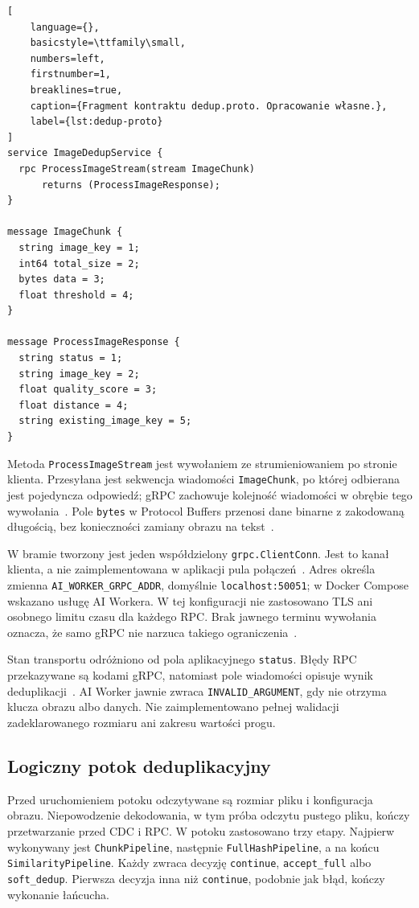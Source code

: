\begin{lstlisting}[
    language={},
    basicstyle=\ttfamily\small,
    numbers=left,
    firstnumber=1,
    breaklines=true,
    caption={Fragment kontraktu dedup.proto. Opracowanie własne.},
    label={lst:dedup-proto}
]
service ImageDedupService {
  rpc ProcessImageStream(stream ImageChunk)
      returns (ProcessImageResponse);
}

message ImageChunk {
  string image_key = 1;
  int64 total_size = 2;
  bytes data = 3;
  float threshold = 4;
}

message ProcessImageResponse {
  string status = 1;
  string image_key = 2;
  float quality_score = 3;
  float distance = 4;
  string existing_image_key = 5;
}
\end{lstlisting}

Metoda \texttt{ProcessImageStream} jest wywołaniem ze strumieniowaniem
po stronie klienta. Przesyłana jest sekwencja wiadomości
\texttt{ImageChunk}, po której odbierana jest pojedyncza odpowiedź;
gRPC zachowuje kolejność wiadomości w obrębie tego
wywołania~\cite{grpc_core_concepts}.
Pole \texttt{bytes} w Protocol Buffers przenosi dane binarne
z zakodowaną długością, bez konieczności zamiany obrazu
na tekst~\cite{protobuf_encoding}.

W bramie tworzony jest jeden współdzielony \texttt{grpc.ClientConn}.
Jest to kanał klienta, a nie zaimplementowana w aplikacji pula
połączeń~\cite{grpc_go_client}.
Adres określa zmienna
\texttt{AI\_\allowbreak WORKER\_\allowbreak GRPC\_\allowbreak ADDR},
domyślnie \texttt{localhost:50051}; w Docker Compose wskazano usługę
AI Workera. W tej konfiguracji nie zastosowano TLS ani osobnego
limitu czasu dla każdego RPC.
Brak jawnego terminu wywołania oznacza, że samo gRPC nie narzuca
takiego ograniczenia~\cite{grpc_deadlines}.

Stan transportu odróżniono od pola aplikacyjnego \texttt{status}.
Błędy RPC przekazywane są kodami gRPC, natomiast pole wiadomości
opisuje wynik deduplikacji~\cite{grpc_status_codes}.
AI Worker jawnie zwraca \texttt{INVALID\_ARGUMENT}, gdy nie otrzyma
klucza obrazu albo danych. Nie zaimplementowano pełnej walidacji
zadeklarowanego rozmiaru ani zakresu wartości progu.

\subsection{Logiczny potok deduplikacyjny}
\label{subsec:logiczny-potok}

Przed uruchomieniem potoku odczytywane są rozmiar pliku i konfiguracja
obrazu. Niepowodzenie dekodowania, w tym próba odczytu pustego pliku,
kończy przetwarzanie przed CDC i RPC.
W potoku zastosowano trzy etapy. Najpierw wykonywany jest
\texttt{ChunkPipeline}, następnie \texttt{FullHashPipeline},
a na końcu \texttt{SimilarityPipeline}.
Każdy zwraca decyzję \texttt{continue}, \texttt{accept\_full}
albo \texttt{soft\_dedup}. Pierwsza decyzja inna niż
\texttt{continue}, podobnie jak błąd, kończy wykonanie łańcucha.

